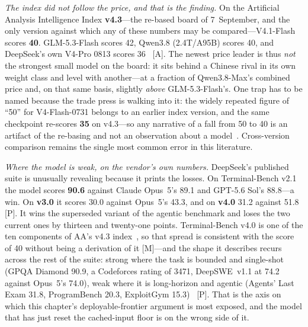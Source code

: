 \emph{The index did not follow the price, and that is the finding.} On the Artificial Analysis Intelligence Index \textbf{v4.3}---the re-based board of 7~September, and the only version against which any of these numbers may be compared---V4.1-Flash scores \textbf{40}. GLM-5.3-Flash scores 42, Qwen3.8 (2.4T/A95B) scores 40, and DeepSeek's own V4-Pro 0813 scores 36~\cite{aa-v41flash} [A]. The newest price leader is thus \emph{not} the strongest small model on the board: it sits behind a Chinese rival in its own weight class and level with another---at a fraction of Qwen3.8-Max's combined price and, on that same basis, slightly \emph{above} GLM-5.3-Flash's. One trap has to be named because the trade press is walking into it: the widely repeated figure of ``50'' for V4-Flash-0731 belongs to an earlier index version, and the same checkpoint re-scores \textbf{35} on v4.3---so any narrative of a fall from 50 to 40 is an artifact of the re-basing and not an observation about a model~\cite{aa-v41flash}. Cross-version comparison remains the single most common error in this literature.

\emph{Where the model is weak, on the vendor's own numbers.} DeepSeek's published suite is unusually revealing because it prints the losses. On Terminal-Bench v2.1 the model scores \textbf{90.6} against Claude Opus~5's 89.1 and GPT-5.6 Sol's 88.8---a win. On \textbf{v3.0} it scores 30.0 against Opus~5's 43.3, and on \textbf{v4.0} 31.2 against 51.8~\cite{deepseek-v41flash} [P]. It wins the superseded variant of the agentic benchmark and loses the two current ones by thirteen and twenty-one points. Terminal-Bench v4.0 is one of the ten components of AA's v4.3 index~\cite{aa-v43}, so that spread is consistent with the score of 40 without being a derivation of it [M]---and the shape it describes recurs across the rest of the suite: strong where the task is bounded and single-shot (GPQA Diamond 90.9, a Codeforces rating of 3471, DeepSWE~v1.1 at 74.2 against Opus~5's 74.0), weak where it is long-horizon and agentic (Agents' Last Exam 31.8, ProgramBench 20.3, ExploitGym 15.3)~\cite{deepseek-v41flash} [P]. That is the axis on which this chapter's deployable-frontier argument is most exposed, and the model that has just reset the cached-input floor is on the wrong side of it.

